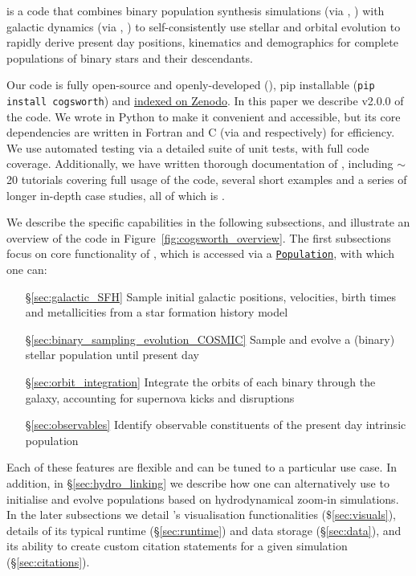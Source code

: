 \documentclass[twocolumn, twocolappendix, oneside]{aastex631}
\newcommand{\codeLink}[2]{{\href{https://cogsworth.readthedocs.io/en/latest/api/cogsworth.#2.#1.html}{\color{codecolour} \texttt{#1}}}}
\begin{document}
\cogsworth is a code that combines binary population synthesis simulations (via \cosmic, \citealp{COSMIC}) with galactic dynamics (via \gala, \citealp{Gala}) to self-consistently use stellar and orbital evolution to rapidly derive present day positions, kinematics and demographics for complete populations of binary stars and their descendants. 

Our code is fully open-source and openly-developed (), pip installable (\texttt{pip install cogsworth}) and \href{https://zenodo.org/records/13709381}{indexed on Zenodo}. In this paper we describe v2.0.0 of the code. We wrote \cogsworth in Python to make it convenient and accessible, but its core dependencies are written in Fortran and C (via \cosmic and \gala respectively) for efficiency. We use automated testing via a detailed suite of unit tests, with full code coverage. Additionally, we have written thorough documentation of \cogsworth, including  $\sim$20 tutorials covering full usage of the code, several short examples and a series of longer in-depth case studies, all of which is .

We describe the specific capabilities in the following subsections, and illustrate an overview of the code in Figure~\ref{fig:cogsworth_overview}. The first subsections focus on core functionality of \cogsworth, which is accessed via a \codeLink{Population}{pop}, with which one can:

\begin{itemize}
    \item [\S\ref{sec:galactic_SFH}] Sample initial galactic positions, velocities, birth times and metallicities from a star formation history model
    \item [\S\ref{sec:binary_sampling_evolution_COSMIC}] Sample and evolve a (binary) stellar population until present day
    \item [\S\ref{sec:orbit_integration}] Integrate the orbits of each binary through the galaxy, accounting for supernova kicks and disruptions
    \item [\S\ref{sec:observables}] Identify observable constituents of the present day intrinsic population
\end{itemize}
Each of these features are flexible and can be tuned to a particular use case. In addition, in \S\ref{sec:hydro_linking} we describe how one can alternatively use \cogsworth to initialise and evolve populations based on hydrodynamical zoom-in simulations. In the later subsections we detail \cogsworth's visualisation functionalities (\$\ref{sec:visuals}), details of its typical runtime (\S\ref{sec:runtime}) and data storage (\S\ref{sec:data}), and its ability to create custom citation statements for a given simulation (\S\ref{sec:citations}).
\end{document}
